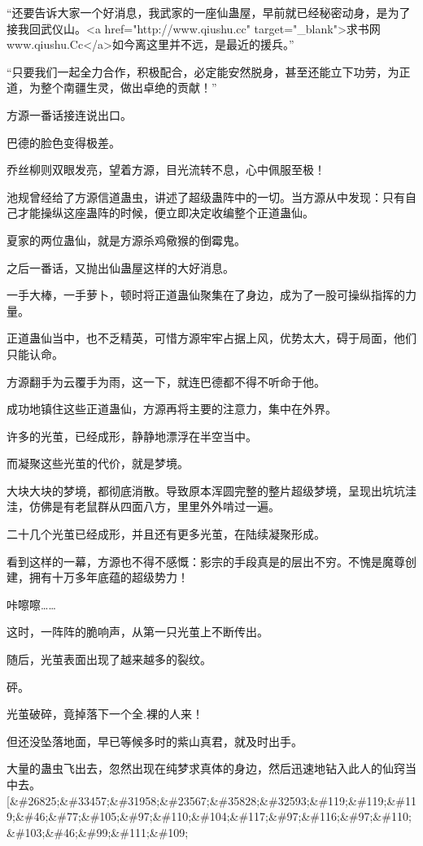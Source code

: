 
\begin{this_body}

“还要告诉大家一个好消息，我武家的一座仙蛊屋，早前就已经秘密动身，是为了接我回武仪山。<a href="http://www.qiushu.cc" target="\_blank">求书网www.qiushu.Cc</a>如今离这里并不远，是最近的援兵。”

“只要我们一起全力合作，积极配合，必定能安然脱身，甚至还能立下功劳，为正道，为整个南疆生灵，做出卓绝的贡献！”

方源一番话接连说出口。

巴德的脸色变得极差。

乔丝柳则双眼发亮，望着方源，目光流转不息，心中佩服至极！

池规曾经给了方源信道蛊虫，讲述了超级蛊阵中的一切。当方源从中发现：只有自己才能操纵这座蛊阵的时候，便立即决定收编整个正道蛊仙。

夏家的两位蛊仙，就是方源杀鸡儆猴的倒霉鬼。

之后一番话，又抛出仙蛊屋这样的大好消息。

一手大棒，一手萝卜，顿时将正道蛊仙聚集在了身边，成为了一股可操纵指挥的力量。

正道蛊仙当中，也不乏精英，可惜方源牢牢占据上风，优势太大，碍于局面，他们只能认命。

方源翻手为云覆手为雨，这一下，就连巴德都不得不听命于他。

成功地镇住这些正道蛊仙，方源再将主要的注意力，集中在外界。

许多的光茧，已经成形，静静地漂浮在半空当中。

而凝聚这些光茧的代价，就是梦境。

大块大块的梦境，都彻底消散。导致原本浑圆完整的整片超级梦境，呈现出坑坑洼洼，仿佛是有老鼠群从四面八方，里里外外啃过一遍。

二十几个光茧已经成形，并且还有更多光茧，在陆续凝聚形成。

看到这样的一幕，方源也不得不感慨：影宗的手段真是的层出不穷。不愧是魔尊创建，拥有十万多年底蕴的超级势力！

咔嚓嚓……

这时，一阵阵的脆响声，从第一只光茧上不断传出。

随后，光茧表面出现了越来越多的裂纹。

砰。

光茧破碎，竟掉落下一个全.裸的人来！

但还没坠落地面，早已等候多时的紫山真君，就及时出手。

大量的蛊虫飞出去，忽然出现在纯梦求真体的身边，然后迅速地钻入此人的仙窍当中去。[\&\#26825;\&\#33457;\&\#31958;\&\#23567;\&\#35828;\&\#32593;\&\#119;\&\#119;\&\#119;\&\#46;\&\#77;\&\#105;\&\#97;\&\#110;\&\#104;\&\#117;\&\#97;\&\#116;\&\#97;\&\#110;\&\#103;\&\#46;\&\#99;\&\#111;\&\#109;


\end{this_body}
